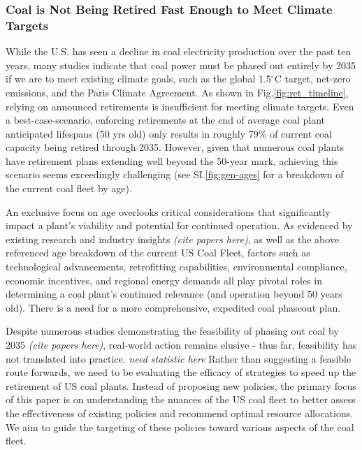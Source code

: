 \subsubsection*{Coal is Not Being Retired Fast Enough to Meet Climate Targets}
While the U.S. has seen a decline in coal electricity production over the past ten years, many studies indicate that coal power must be phased out entirely by 2035 if we are to meet existing climate goals, such as the global 1.5$^\circ$C target,
net-zero emissions, 
and the Paris Climate Agreement. As shown in Fig.\ref{fig:ret_timeline}, relying on announced retirements is insufficient for meeting climate targets.
Even a best-case-scenario, enforcing retirements at the end of average coal plant anticipated lifespans (50 yrs old) only results in roughly 79\% of current coal capacity being retired through 2035. 
However, given that numerous coal plants have retirement plans extending well beyond the 50-year mark, achieving this scenario seems exceedingly challenging (see SI.\ref{fig:gen-ages} for a breakdown of the current coal fleet by age). 

An exclusive focus on age overlooks critical considerations that significantly impact a plant's viability and potential for continued operation. 
As evidenced by existing research and industry insights \textit{(cite papers here)}, as well as the above referenced age breakdown of the current US Coal Fleet,
factors such as technological advancements, retrofitting capabilities, environmental compliance, economic incentives, and regional energy demands all play pivotal roles in determining a coal plant's continued relevance (and operation beyond 50 years old).
There is a need for a more comprehensive, expedited coal phaseout plan. 

Despite numerous studies demonstrating the feasibility of phasing out coal by 2035 \textit{(cite papers here)}, 
real-world action remains elusive - thus far, feasibility has not translated into practice. \textit{need statistic here} 
Rather than suggesting a feasible route forwards, we need to be evaluating the efficacy of strategies to speed up the retirement of US coal plants. 
Instead of proposing new policies, the primary focus of this paper is on understanding the nuances of the US coal fleet to better assess the effectiveness 
of existing policies and recommend optimal resource allocations. We aim to guide the targeting of these policies toward various aspects of the coal fleet.


